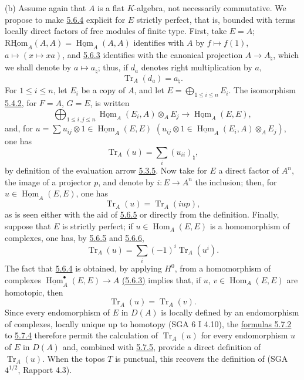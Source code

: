 \documentclass[11pt]{article}
\providecommand{\uHom}{\underline{\Hom}}
\providecommand{\uRHom}{\underline{\RHom}}
\DeclareMathOperator{\Hom}{Hom}
\providecommand{\RHom}{\mathrm{RHom}}
\providecommand{\Tr}{\operatorname{Tr}}
\providecommand{\Tr}{\operatorname{Tr}}
\providecommand{\Tr}{\operatorname{Tr}}
\providecommand{\RHom}{\mathrm{RHom}}
\providecommand{\Hom}{\operatorname{Hom}}
\providecommand{\RHom}{\mathrm R\mathcal{H}om}
\providecommand{\Tr}{\operatorname{Tr}}
\providecommand{\RHom}{\mathrm{RHom}}
\providecommand{\Hom}{\operatorname{Hom}}
\providecommand{\Tr}{\operatorname{Tr}}
\begin{document}
(b) Assume again that $A$ is a flat $K$-algebra, not necessarily commutative. We propose to make \hyperref[sga5:IIIB:equation:5.6.4]{5.6.4} explicit for $E$ strictly perfect, that is, bounded with terms locally direct factors of free modules of finite type. First, take $E=A$; $\uRHom_A(A,A)=\uHom_A(A,A)$ identifies with $A$ by $f\mapsto f(1)$, $a\mapsto(x\mapsto xa)$, and \hyperref[sga5:IIIB:equation:5.6.3]{5.6.3} identifies with the canonical projection $A\to A_\natural$, which we shall denote by $a\mapsto a_\natural$; thus, if $d_a$ denotes right multiplication by $a$,
\begin{equation}\tag{5.7.1}\label{sga5:IIIB:equation:5.7.1}
\Tr_A(d_a)=a_\natural.
\end{equation}
For $1\le i\le n$, let $E_i$ be a copy of $A$, and let $E=\bigoplus_{1\le i\le n}E_i$. The isomorphism \hyperref[sga5:IIIB:equation:5.4.2]{5.4.2}, for $F=A$, $G=E$, is written
\[
\bigoplus_{1\le i,j\le n}\uHom_A(E_i,A)\otimes_AE_j\longrightarrow\uHom_A(E,E),
\]
and, for $u=\sum u_{ij}\otimes 1\in\uHom_A(E,E)$ $(u_{ij}\otimes 1\in\uHom_A(E_i,A)\otimes_A E_j)$, one has
\begin{equation}\tag{5.7.2}\label{sga5:IIIB:equation:5.7.2}
\Tr_A(u)=\sum_i (u_{ii})_\natural,
\end{equation}
by definition of the evaluation arrow \hyperref[sga5:IIIB:equation:5.3.5]{5.3.5}. Now take for $E$ a direct factor of $A^n$, the image of a projector $p$, and denote by $i:E\to A^n$ the inclusion; then, for $u\in\uHom_A(E,E)$, one has
\begin{equation}\tag{5.7.3}\label{sga5:IIIB:equation:5.7.3}
\Tr_A(u)=\Tr_A(iup),
\end{equation}
as is seen either with the aid of \hyperref[sga5:IIIB:equation:5.6.5]{5.6.5} or directly from the definition. Finally, suppose that $E$ is strictly perfect; if $u\in\Hom_A(E,E)$ is a homomorphism of complexes, one has, by \hyperref[sga5:IIIB:equation:5.6.5]{5.6.5} and \hyperref[sga5:IIIB:equation:5.6.6]{5.6.6},
\begin{equation}\tag{5.7.4}\label{sga5:IIIB:equation:5.7.4}
\Tr_A(u)=\sum_i(-1)^i\Tr_A(u^i).
\end{equation}
The fact that \hyperref[sga5:IIIB:equation:5.6.4]{5.6.4} is obtained, by applying $H^0$, from a homomorphism of complexes $\uHom_A^\bullet(E,E)\to A$ \hyperref[sga5:IIIB:equation:5.6.3]{(5.6.3)} implies that, if $u$, $v\in\Hom_A(E,E)$ are homotopic, then
\begin{equation}\tag{5.7.5}\label{sga5:IIIB:equation:5.7.5}
\Tr_A(u)=\Tr_A(v).
\end{equation}
Since every endomorphism of $E$ in $D(A)$ is locally defined by an endomorphism of complexes, locally unique up to homotopy (SGA 6 I 4.10), the \hyperref[sga5:IIIB:equation:5.7.2]{formulas 5.7.2} to \hyperref[sga5:IIIB:equation:5.7.4]{5.7.4} therefore permit the calculation of $\Tr_A(u)$ for every endomorphism $u$ of $E$ in $D(A)$ and, combined with \hyperref[sga5:IIIB:equation:5.7.5]{5.7.5}, provide a direct definition of $\Tr_A(u)$. When the topos $T$ is punctual, this recovers the definition of (SGA $4^{1/2}$, Rapport 4.3).
\end{document}
